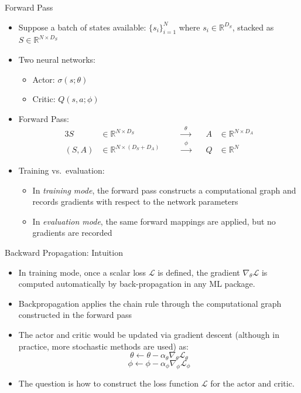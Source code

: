 \documentclass[aspectratio=169]{beamer}
\newcommand{\1}{\mathbf{1}}
\begin{document}
\begin{frame}{Forward Pass}
\small
  \begin{itemize}
      \item Suppose a batch of states available: $\{ s_i \}_{i=1}^N$ where $s_i \in \mathbb{R}^{D_S}$, stacked as $S \in \mathbb{R}^{N \times D_S}$
      \item Two neural networks:
      \begin{itemize}
          \item Actor: $\sigma(s;\theta)$
          \item Critic: $Q(s,a;\phi)$
      \end{itemize}
      \item Forward Pass:
        \begin{alignat*}{3}
          S &\in \mathbb{R}^{N \times D_S} \quad&& \xrightarrow{\;\;\theta\;\;} \quad& A &\in \mathbb{R}^{N \times D_A}\\
          (S,A) &\in \mathbb{R}^{N \times (D_S+D_A)} \quad&& \xrightarrow{\;\;\phi\;\;} \quad& Q &\in \mathbb{R}^{N}
        \end{alignat*}

      \item Training vs.\ evaluation:
      \begin{itemize}
          \item In \emph{training mode}, the forward pass constructs a computational graph and records gradients with respect to the network parameters
          \item In \emph{evaluation mode}, the same forward mappings are applied, but no gradients are recorded
      \end{itemize}

  \end{itemize}
\end{frame}






\begin{frame}{Backward Propagation: Intuition}
  \small
  \begin{itemize}
      \item In training mode, once a scalar loss $\mathcal{L}$ is defined, the gradient $\nabla_\theta \mathcal{L}$ is computed automatically by back-propagation in any ML package.
      \item Backpropagation applies the chain rule through the computational graph constructed in the forward pass
  

      \item The actor and critic would be updated via gradient descent (although in practice, more stochastic methods are used) as:
      $$
      \theta \leftarrow \theta - \alpha_\theta \nabla_\theta \mathcal{L}_\theta
      $$
      $$
      \phi \leftarrow \phi - \alpha_\phi \nabla_\phi \mathcal{L}_\phi
      $$

      \item The question is how to construct the loss function $\mathcal{L}$ for the actor and critic.
  
  \end{itemize}
  \end{frame}
\end{document}
